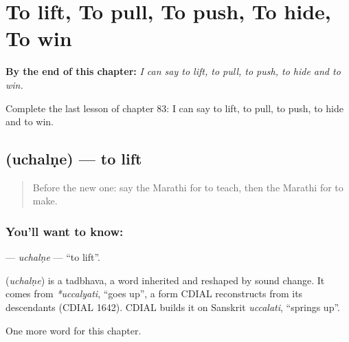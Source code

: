 
\chapter{To lift, To pull, To push, To hide, To win}
\label{ch:mr-to-lift-to-pull-to-push-to-hide-to-win}

\begin{chapteropening}
\textbf{By the end of this chapter:} \emph{I can say to lift, to pull, to push, to hide and to win.}

Complete the last lesson of chapter 83: I can say to lift, to pull, to push, to hide and to win.
\end{chapteropening}

\section[\texorpdfstring{\mr{उचलणे} (uchalṇe)}{उचलणे (uchalṇe)}]{ (uchalṇe) — to lift}

\label{lesson:MR-C83-uchalne}



\begin{quote}
Before the new one: say the Marathi for to teach, then the Marathi for to make.
\end{quote}

\subsection*{You'll want to know: }
\textbf{} — \emph{uchalṇe} — \textquotedblleft{}to lift\textquotedblright{}.

\begin{cousinweb}
\textbf{} (\emph{uchalṇe}) is a tadbhava, a word inherited and reshaped by sound change. It comes from \emph{*uccalyati}, \textquotedblleft{}goes up\textquotedblright{}, a form CDIAL reconstructs from its descendants (CDIAL 1642). CDIAL builds it on Sanskrit \emph{uccalati}, \textquotedblleft{}springs up\textquotedblright{}.
\end{cousinweb}

\begin{grammarlens}[title={What you've built}]
One more word for this chapter.
\end{grammarlens}

